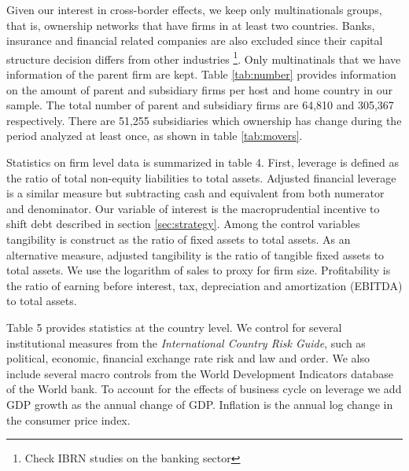 \documentclass[12pt]{article}
\begin{document}
	Given our interest in cross-border effects, we keep only multinationals groups, that is, ownership networks that have firms in at least two countries. Banks, insurance and financial related companies are also excluded since their capital structure decision differs from other industries \footnote{Check IBRN studies on the banking sector}. Only multinatinals that we have information of the parent firm are kept. Table \ref{tab:number} provides information on the amount of parent and subsidiary firms per host and home country in our sample. The total number of parent and subsidiary firms are 64,810 and 305,367 respectively. There are 51,255 subsidiaries which ownership has change during the period analyzed at least once, as shown in table \ref{tab:movers}. 
	
	Statistics on firm level data is summarized in table 4. First, leverage is defined as the ratio of total non-equity liabilities to total assets. Adjusted financial leverage is a similar measure but subtracting cash and equivalent from both numerator and denominator. Our variable of interest is the macroprudential incentive to shift debt described in section \ref{sec:strategy}. Among the control variables tangibility is construct as the ratio of fixed assets to total assets. As an alternative measure, adjusted tangibility is the ratio of tangible fixed assets to total assets. We use the logarithm of sales to proxy for firm size. Profitability is the ratio of earning before interest, tax, depreciation and amortization (EBITDA) to total assets. 
	
	Table 5 provides statistics at the country level. We control for several institutional measures from the \textit{International Country Risk Guide}, such as political, economic, financial exchange rate risk and law and order. 
	We also include several macro controls from the World Development Indicators database of the World bank. To account for the effects of business cycle on leverage we add GDP growth as the annual change of GDP. 
	Inflation is the annual log change in the consumer price index.     
	
\end{document}
